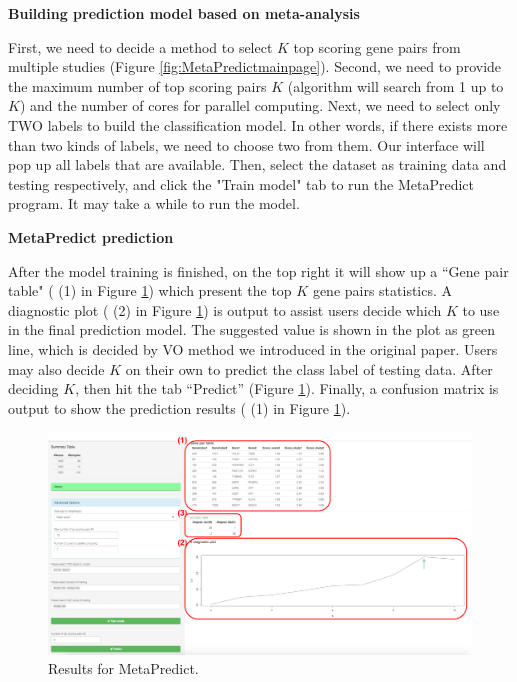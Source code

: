 \begin{steps}
\item \textbf{Building prediction model based on meta-analysis}

First, we need to decide a method to select $K$ top scoring gene pairs from multiple studies (Figure \ref{fig:MetaPredictmainpage}). 
Second, we need to provide the maximum number of top scoring pairs $K$ (algorithm will search from 1 up to $K$) and the number of cores for parallel computing. 
Next, we need to select only TWO labels to build the classification model. 
In other words, if there exists more than two kinds of labels, we need to choose two from them. 
Our interface will pop up all labels that are available. 
Then, select the dataset as training data and testing respectively, 
and click the "Train model" tab to run the MetaPredict program. 
It may take a while to run the model.

\item \textbf{MetaPredict prediction}

After the model training is finished, on the top right it will show up a ``Gene pair table" ({\color{red} (1)} in Figure \ref{fig:MetaPredictresult}) which present the top $K$ gene pairs statistics. 
A diagnostic plot ({\color{red} (2)} in Figure \ref{fig:MetaPredictresult}) is output to assist users decide which $K$ to use in the final prediction model. 
The suggested value is shown in the plot as green line, which is decided by VO method we introduced in the original paper. Users may also decide $K$ on their own to predict the class label of testing data. 
After deciding $K$, then hit the tab ``Predict'' (Figure \ref{fig:MetaPredictresult}). 
Finally, a confusion matrix is output to show the prediction results ({\color{red} (1)} in Figure \ref{fig:MetaPredictresult}).

\begin{figure}[H]
\begin{center}
\includegraphics[scale=0.5]{./figure/MetaPredict/MetaPredictresult.pdf}
\caption{Results for MetaPredict.}
\label{fig:MetaPredictresult}
\end{center}
\end{figure}

\end{steps}

